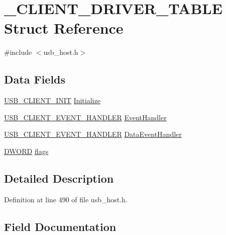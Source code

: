 \hypertarget{struct___c_l_i_e_n_t___d_r_i_v_e_r___t_a_b_l_e}{}\section{\+\_\+\+C\+L\+I\+E\+N\+T\+\_\+\+D\+R\+I\+V\+E\+R\+\_\+\+T\+A\+B\+L\+E Struct Reference}
\label{struct___c_l_i_e_n_t___d_r_i_v_e_r___t_a_b_l_e}


{\ttfamily \#include $<$usb\+\_\+host.\+h$>$}

\subsection*{Data Fields}
\begin{DoxyCompactItemize}
\item 
\hyperlink{usb__host_8h_aa6a614ef98ba68b8056a7b94743d6ba6}{U\+S\+B\+\_\+\+C\+L\+I\+E\+N\+T\+\_\+\+I\+N\+I\+T} \hyperlink{struct___c_l_i_e_n_t___d_r_i_v_e_r___t_a_b_l_e_a7502b180ac12935de0b4b5dfd8c21e04}{Initialize}
\item 
\hyperlink{usb__host_8h_ab75f26c56d321defbed43234aeb14e50}{U\+S\+B\+\_\+\+C\+L\+I\+E\+N\+T\+\_\+\+E\+V\+E\+N\+T\+\_\+\+H\+A\+N\+D\+L\+E\+R} \hyperlink{struct___c_l_i_e_n_t___d_r_i_v_e_r___t_a_b_l_e_ace9fd8d248ccc90433bfa4cd094e442e}{Event\+Handler}
\item 
\hyperlink{usb__host_8h_ab75f26c56d321defbed43234aeb14e50}{U\+S\+B\+\_\+\+C\+L\+I\+E\+N\+T\+\_\+\+E\+V\+E\+N\+T\+\_\+\+H\+A\+N\+D\+L\+E\+R} \hyperlink{struct___c_l_i_e_n_t___d_r_i_v_e_r___t_a_b_l_e_af1a4049a27d5ea7ab1a5b31fd24988c7}{Data\+Event\+Handler}
\item 
\hyperlink{_generic_type_defs_8h_ad342ac907eb044443153a22f964bf0af}{D\+W\+O\+R\+D} \hyperlink{struct___c_l_i_e_n_t___d_r_i_v_e_r___t_a_b_l_e_a29bb851466268efcf57e7e81e2d0ab09}{flags}
\end{DoxyCompactItemize}


\subsection{Detailed Description}


Definition at line 490 of file usb\+\_\+host.\+h.



\subsection{Field Documentation}
\hypertarget{struct___c_l_i_e_n_t___d_r_i_v_e_r___t_a_b_l_e_af1a4049a27d5ea7ab1a5b31fd24988c7}{}
